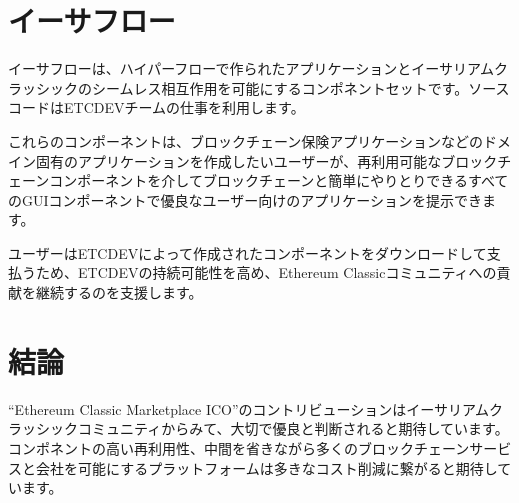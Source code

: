\documentclass[%
 aip,
 jmp,
 amsmath,amssymb,
 preprint,
 reprint,
 author-year,
 author-numerical,
]{revtex4-1}
\begin{document}
\begin{CJK}{UTF8}{ipxm}
\section{\label{sec:Etherflow}イーサフロー}

イーサフローは、ハイパーフローで作られたアプリケーションとイーサリアムクラッシックのシームレス相互作用を可能にするコンポネントセットです。ソースコードはETCDEVチームの仕事を利用します。

これらのコンポーネントは、ブロックチェーン保険アプリケーションなどのドメイン固有のアプリケーションを作成したいユーザーが、再利用可能なブロックチェーンコンポーネントを介してブロックチェーンと簡単にやりとりできるすべてのGUIコンポーネントで優良なユーザー向けのアプリケーションを提示できます。

ユーザーはETCDEVによって作成されたコンポーネントをダウンロードして支払うため、ETCDEVの持続可能性を高め、Ethereum Classicコミュニティへの貢献を継続するのを支援します。

\section{\label{sec:Conclusion}結論}

``Ethereum Classic Marketplace ICO''のコントリビューションはイーサリアムクラッシックコミュニティからみて、大切で優良と判断されると期待しています。
コンポネントの高い再利用性、中間を省きながら多くのブロックチェーンサービスと会社を可能にするプラットフォームは多きなコスト削減に繋がると期待しています。

\end{CJK}
\end{document}
